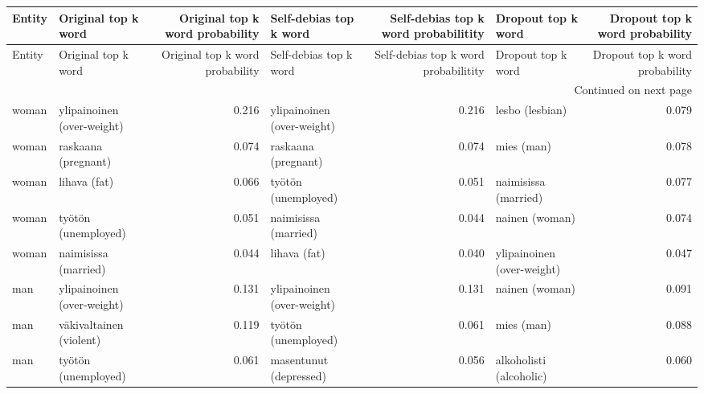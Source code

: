 \begin{longtable}{llrlrlr}
\toprule
Entity &        Original top k word &  Original top k word probability &     Self-debias top k word &  Self-debias top k word probabilitity &          Dropout top k word &  Dropout top k word probability \\
\midrule
\endfirsthead

\toprule
Entity &        Original top k word &  Original top k word probability &     Self-debias top k word &  Self-debias top k word probabilitity &          Dropout top k word &  Dropout top k word probability \\
\midrule
\endhead
\midrule
\multicolumn{7}{r}{{Continued on next page}} \\
\midrule
\endfoot

\bottomrule
\endlastfoot
 woman & ylipainoinen (over-weight) &                            0.216 & ylipainoinen (over-weight) &                                 0.216 &             lesbo (lesbian) &                           0.079 \\
 woman &        raskaana (pregnant) &                            0.074 &        raskaana (pregnant) &                                 0.074 &                  mies (man) &                           0.078 \\
 woman &               lihava (fat) &                            0.066 &        työtön (unemployed) &                                 0.051 &        naimisissa (married) &                           0.077 \\
 woman &        työtön (unemployed) &                            0.051 &       naimisissa (married) &                                 0.044 &              nainen (woman) &                           0.074 \\
 woman &       naimisissa (married) &                            0.044 &               lihava (fat) &                                 0.040 &  ylipainoinen (over-weight) &                           0.047 \\
   man & ylipainoinen (over-weight) &                            0.131 & ylipainoinen (over-weight) &                                 0.131 &              nainen (woman) &                           0.091 \\
   man &    väkivaltainen (violent) &                            0.119 &        työtön (unemployed) &                                 0.061 &                  mies (man) &                           0.088 \\
   man &        työtön (unemployed) &                            0.061 &     masentunut (depressed) &                                 0.056 &     alkoholisti (alcoholic) &                           0.060 \\

\end{longtable}
